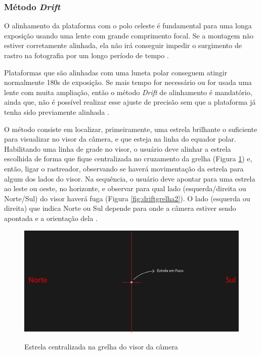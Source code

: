 \subsubsection{Método \textit{Drift}}

O alinhamento da plataforma com o polo celeste é fundamental para uma longa exposição usando uma lente com grande comprimento focal. Se a montagem não estiver corretamente alinhada, ela não irá conseguir impedir o surgimento de rastro na fotografia por um longo período de tempo \cite{book:bbcsky}.  

Plataformas que são alinhadas com uma luneta polar conseguem atingir normalmente 180s de exposição. Se mais tempo for necessário ou for usada uma lente com muita ampliação, então o método \textit{Drift} de alinhamento é mandatório, ainda que, não é possível realizar esse ajuste de precisão sem que a plataforma já tenha sido previamente alinhada \cite{book:bbcsky}. 

O método consiste em localizar, primeiramente, uma estrela brilhante o suficiente para visualizar no visor da câmera, e que esteja na linha do equador polar. Habilitando uma linha de grade no visor, o usuário deve alinhar a estrela escolhida de forma que fique centralizada no cruzamento da grelha (Figura \ref{fig:driftgrelha1}) e, então, ligar o rastreador, observando se haverá movimentação da estrela para algum dos lados do visor. Na sequência, o usuário deve apontar para uma estrela ao leste ou oeste, no horizonte, e observar para qual lado (esquerda/direita ou Norte/Sul) do visor haverá fuga (Figura \ref{fig:driftgrelha2}). O lado (esquerda ou direita) que indica Norte ou Sul depende para onde a câmera estiver sendo apontada e a orientação dela \cite{book:bbcsky}.

\begin{figure}[hbt]
	\centering
	\caption{Estrela centralizada na grelha do visor da câmera}
	\includegraphics[width=0.7\linewidth]{figuras/driftgrelha1}
	\label{fig:driftgrelha1}
\end{figure}

